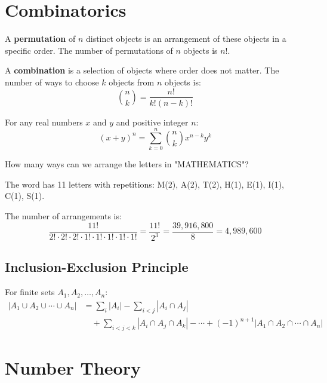\section{Combinatorics}

\begin{definition}[Permutation]
A \textbf{permutation} of $n$ distinct objects is an arrangement of these objects in a specific order. The number of permutations of $n$ objects is $n!$.
\end{definition}

\begin{definition}[Combination]
A \textbf{combination} is a selection of objects where order does not matter. The number of ways to choose $k$ objects from $n$ objects is:
\[\binom{n}{k} = \frac{n!}{k!(n-k)!}\]
\end{definition}

\begin{theorem}
For any real numbers $x$ and $y$ and positive integer $n$:
\[(x + y)^n = \sum_{k=0}^{n} \binom{n}{k} x^{n-k} y^k\]
\end{theorem}

\begin{example}
How many ways can we arrange the letters in "MATHEMATICS"?

The word has 11 letters with repetitions: M(2), A(2), T(2), H(1), E(1), I(1), C(1), S(1).

The number of arrangements is:
\[\frac{11!}{2! \cdot 2! \cdot 2! \cdot 1! \cdot 1! \cdot 1! \cdot 1! \cdot 1!} = \frac{11!}{2^3} = \frac{39,916,800}{8} = 4,989,600\]
\end{example}

\subsection{Inclusion-Exclusion Principle}

\begin{theorem}
For finite sets $A_1, A_2, \ldots, A_n$:
\begin{align}
|A_1 \cup A_2 \cup \cdots \cup A_n| &= \sum_{i} |A_i| - \sum_{i < j} |A_i \cap A_j| \\
&\quad + \sum_{i < j < k} |A_i \cap A_j \cap A_k| - \cdots + (-1)^{n+1}|A_1 \cap A_2 \cap \cdots \cap A_n|
\end{align}
\end{theorem}

\section{Number Theory}

